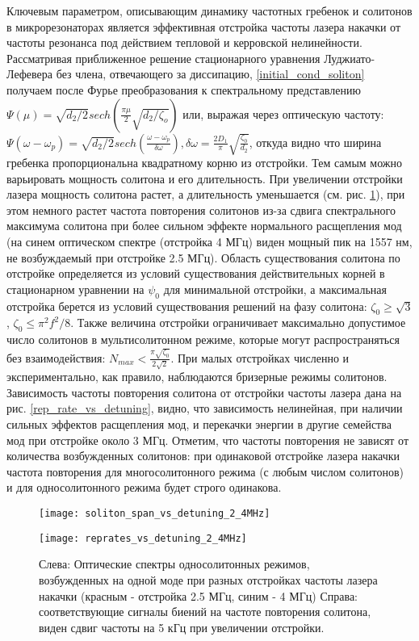 Ключевым параметром, описывающим динамику частотных гребенок и солитонов в микрорезонаторах является эффективная отстройка частоты лазера накачки от частоты резонанса под действием тепловой и керровской нелинейности. Рассматривая приближенное решение стационарного уравнения Луджиато-Лефевера без члена, отвечающего за диссипацию, \ref{initial_cond_soliton} получаем после Фурье преобразования к спектральному представлению $\Psi(\mu)=\sqrt{d_2/2} sech(\frac{\pi\mu}{2}\sqrt{d_2/\zeta_o})$ или, выражая через оптическую частоту: $\Psi(\omega-\omega_p)=\sqrt{d_2/2} sech(\frac{\omega-\omega_p}{\delta\omega}), \delta\omega=\frac{2D_1}{\pi}\sqrt{\frac{\zeta_0}{d_2}}$, откуда видно что ширина гребенка пропорциональна квадратному корню из отстройки. Тем самым можно варьировать мощность солитона и его длительность. При увеличении отстройки лазера мощность солитона растет, а длительность уменьшается (см. рис. \ref{detuning_dependant}), при этом немного растет частота повторения солитонов из-за сдвига спектрального максимума солитона при более сильном эффекте нормального расщепления мод (на синем оптическом спектре (отстройка 4 МГц) виден мощный пик на 1557 нм, не возбуждаемый при отстройке 2.5 МГц). Область существования солитона по отстройке определяется из условий существования действительных корней в стационарном уравнении на $\psi_0$ для минимальной отстройки, а максимальная отстройка берется из условий существования решений на фазу солитона: $\zeta_0\geq\sqrt{3}$, $\zeta_0\leq \pi^2 f^2/8$. Также величина отстройки ограничивает максимально допустимое число солитонов в мультисолитонном режиме, которые могут распространяться без взаимодействия: $N_{max}<\frac{\pi\sqrt{\zeta_0}}{2\sqrt{2}}$. При малых отстройках численно и экспериментально, как правило, наблюдаются бризерные режимы солитонов. Зависимость частоты повторения солитона от отстройки частоты лазера дана на рис. \ref{rep_rate_vs_detuning}, видно, что зависимость нелинейная, при наличии сильных эффектов расщепления мод, и перекачки энергии в другие семейства мод при отстройке около 3 МГц. Отметим, что частоты повторения не зависят от количества возбужденных солитонов: при одинаковой отстройке лазера накачки частота повторения для многосолитонного режима (с любым числом солитонов) и для односолитонного режима будет строго одинакова.

\begin{figure}[ht]
  \begin{minipage}[ht]{0.49\linewidth}\centering
    \texttt{[image: soliton\_span\_vs\_detuning\_2\_4MHz]}
  \end{minipage}
  \hfill
  \begin{minipage}[ht]{0.49\linewidth}\centering
    \texttt{[image: reprates\_vs\_detuning\_2\_4MHz]}
  \end{minipage}
  \caption{Слева: Оптические спектры односолитонных режимов, возбужденных на одной моде при разных отстройках частоты лазера накачки (красным - отстройка 2.5 МГц, синим - 4 МГц) Справа: соответствующие сигналы биений на частоте повторения солитона, виден сдвиг частоты на 5 кГц при увеличении отстройки.}
  \label{detuning_dependant}
\end{figure}

